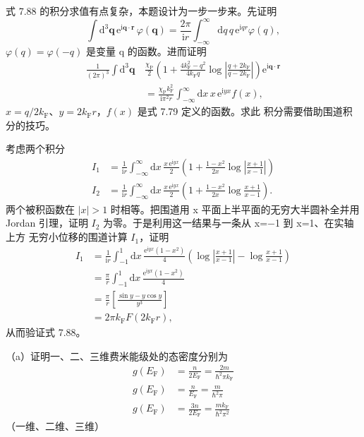  式 7.88 的积分求值有点复杂，本题设计为一步一步来。先证明
\begin{equation*}
\int\mathrm{d}^{3}\mathbf{q}\,\mathrm{e}^{\mathrm{i}\mathbf{q}\cdot\mathbf{r}}\,\varphi(\mathbf{q}) = \frac{2\pi}{\mathrm{i}r}\int_{-\infty}^{\infty}\mathrm{d}q\,q\,\mathrm{e}^{\mathrm{i}qr}\varphi(q),\tag{7.96}
\end{equation*}
$\varphi(q)=\varphi(-q)$ 是变量 q 的函数。进而证明
\begin{align*}
\frac{1}{(2\pi)^{3}}\int\mathrm{d}^{3}\mathbf{q}\, & \frac{\chi_{\mathrm{P}}}{2}\left(1+\frac{4k_{\mathrm{F}}^{2}-q^{2}}{4k_{\mathrm{F}}q}\log\left|\frac{q+2k_{\mathrm{F}}}{q-2k_{\mathrm{F}}}\right|\right)\mathrm{e}^{\mathrm{i}\mathbf{q}\cdot\mathbf{r}}\tag{7.97}\\
&= \frac{\chi_{\mathrm{P}}k_{\mathrm{F}}^{2}}{\mathrm{i}\pi^{2}r}\int_{-\infty}^{\infty}\mathrm{d}x\,x\,\mathrm{e}^{\mathrm{i}yx}f(x),\tag{7.98}
\end{align*}
$x=q/2k_{\mathrm{F}}$、$y=2k_{\mathrm{F}}r$，$f(x)$ 是式 7.79 定义的函数。求此
积分需要借助围道积分的技巧。

考虑两个积分
\begin{align*}
I_1 &= \frac{1}{\mathrm{i}r}\int_{-\infty}^{\infty}\mathrm{d}x\,\frac{x\,\mathrm{e}^{\mathrm{i}yx}}{2}\left(1+\frac{1-x^{2}}{2x}\log\left|\frac{x+1}{x-1}\right|\right)\tag{7.99}\\
I_2 &= \frac{1}{\mathrm{i}r}\int_{-\infty}^{\infty}\mathrm{d}x\,\frac{x\,\mathrm{e}^{\mathrm{i}yx}}{2}\left(1+\frac{1-x^{2}}{2x}\log\frac{x+1}{x-1}\right).\tag{7.100}
\end{align*}
两个被积函数在 $|x|>1$ 时相等。把围道用 x 平面上半平面的无穷大半圆补全并用
Jordan 引理，证明 $I_2$ 为零。于是利用这一结果与一条从 x=−1 到 x=1、在实轴上方
无穷小位移的围道计算 $I_1$，证明
\begin{align*}
I_1 &= \frac{1}{\mathrm{i}r}\int_{-1}^{1}\mathrm{d}x\,\frac{\mathrm{e}^{\mathrm{i}yx}(1-x^{2})}{4}\left(\log\left|\frac{x+1}{x-1}\right|-\log\frac{x+1}{x-1}\right)\\
&= \frac{\pi}{r}\int_{-1}^{1}\mathrm{d}x\,\frac{\mathrm{e}^{\mathrm{i}yx}(1-x^{2})}{4}\\
&= \frac{\pi}{r}\left[\frac{\sin y-y\cos y}{y^{3}}\right]\\
&= 2\pi k_{\mathrm{F}}F(2k_{\mathrm{F}}r),\tag{7.101}
\end{align*}
从而验证式 7.88。

 （a）证明一、二、三维费米能级处的态密度分别为
\begin{equation*}
\begin{aligned}
g(E_{\mathrm{F}}) &= \frac{n}{2E_{\mathrm{F}}} = \frac{2m}{\hbar^{2}\pi k_{\mathrm{F}}}\\
g(E_{\mathrm{F}}) &= \frac{n}{E_{\mathrm{F}}} = \frac{m}{\hbar^{2}\pi}\\
g(E_{\mathrm{F}}) &= \frac{3n}{2E_{\mathrm{F}}} = \frac{mk_{\mathrm{F}}}{\hbar^{2}\pi^{2}}
\end{aligned}\tag{7.102}
\end{equation*}
（一维、二维、三维）

